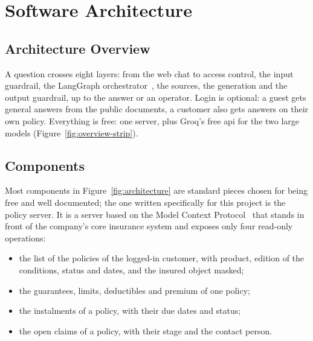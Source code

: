 \chapter{Software Architecture}
\label{chap:architecture}

\section{Architecture Overview}
\label{sec:architecture-overview}

A question crosses eight layers: from the web chat to access control, the input guardrail, the
LangGraph orchestrator~\cite{langgraph}, the sources, the generation and the
output guardrail, up to the answer or an operator. Login is optional: a guest gets general answers
from the public documents, a customer also gets answers on their own policy. Everything is free:
one server, plus Groq's free \acs{api} for the two large models (Figure~\ref{fig:overview-strip}).



\section{Components}
\label{sec:components}

Most components in Figure~\ref{fig:architecture} are standard pieces chosen for being free and
well documented; the one written specifically for this project is the policy server. It is a
server based on the Model Context Protocol~\cite{mcp} that stands in
front of the company's core insurance system and exposes only four read-only operations:

\begin{itemize}
  \item the list of the policies of the logged-in customer, with product, edition of the
    conditions, status and dates, and the insured object masked;
  \item the guarantees, limits, deductibles and premium of one policy;
  \item the instalments of a policy, with their due dates and status;
  \item the open claims of a policy, with their stage and the contact person.
\end{itemize}

